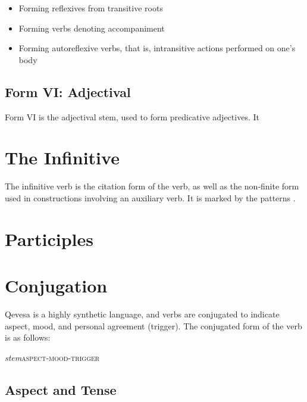 \documentclass[grammar]{subfiles}
\begin{document}
\begin{itemize}
  \item Forming reflexives from transitive roots 
  \item Forming verbs denoting accompaniment 
  \item Forming autoreflexive verbs, that is, intransitive actions performed on one’s body
\end{itemize}


\subsection{Form VI: Adjectival}
\label{ssec:vm_form_vi}

Form VI is the adjectival stem, used to form predicative adjectives.  It 


\section{The Infinitive}
\label{sec:vm_infinitive}

The infinitive verb is the citation form of the verb, as well as the non-finite
form used in constructions involving an auxiliary verb.  It is marked by the
patterns .

\ToBeWritten

\section{Participles}


\section{Conjugation}
\label{sec:vm_conjugation}

Qevesa is a highly synthetic language, and verbs are conjugated to indicate
aspect, mood, and personal agreement (trigger).  The conjugated form of the
verb is as follows:

\begin{exe}
  \ex\label{exe:vm_conjugation} \textit{stem}\bs\textsc{aspect-mood-trigger}
\end{exe}

\subsection{Aspect and Tense}
\label{ssec:vm_aspect_tense}
\end{document}
